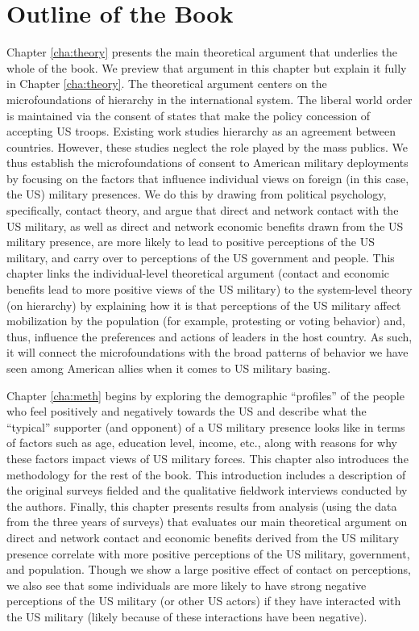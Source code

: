 \section*{Outline of the Book}
Chapter \ref{cha:theory} presents the main theoretical argument that underlies the whole of the book. We preview that argument in this chapter but explain it fully in Chapter \ref{cha:theory}. The theoretical argument centers on the microfoundations of hierarchy in the international system. The liberal world order is maintained via the consent of states that make the policy concession of accepting US troops. Existing work studies hierarchy as an agreement between countries. However, these studies neglect the role played by the mass publics. We thus establish the microfoundations of consent to American military deployments by focusing on the factors that influence individual views on foreign (in this case, the US) military presences. We do this by drawing from political psychology, specifically, contact theory, and argue that direct and network contact with the US military, as well as direct and network economic benefits drawn from the US military presence, are more likely to lead to positive perceptions of the US military, and carry over to perceptions of the US government and people.\autocite{Pettigrew1998,Woolcock2000,Putnam2001,Huckfeldt2001} This chapter links the individual-level theoretical argument (contact and economic benefits lead to more positive views of the US military) to the system-level theory (on hierarchy) by explaining how it is that perceptions of the US military affect mobilization by the population (for example, protesting or voting behavior) and, thus, influence the preferences and actions of leaders in the host country. As such, it will connect the microfoundations with the broad patterns of behavior we have seen among American allies when it comes to US military basing.


Chapter \ref{cha:meth} begins by exploring the demographic ``profiles'' of the people who feel positively and negatively towards the US and describe what the ``typical'' supporter (and opponent) of a US military presence looks like in terms of factors such as age, education level, income, etc., along with reasons for why these factors impact views of US military forces. This chapter also introduces the methodology for the rest of the book. This introduction includes a description of the original surveys fielded and the qualitative fieldwork interviews conducted by the authors. Finally, this chapter presents results from analysis (using the data from the three years of surveys) that evaluates our main theoretical argument on direct and network contact and economic benefits derived from the US military presence correlate with more positive perceptions of the US military, government, and population. Though we show a large positive effect of contact on perceptions, we also see that some individuals are more likely to have strong negative perceptions of the US military (or other US actors) if they have interacted with the US military (likely because of these interactions have been negative). 

